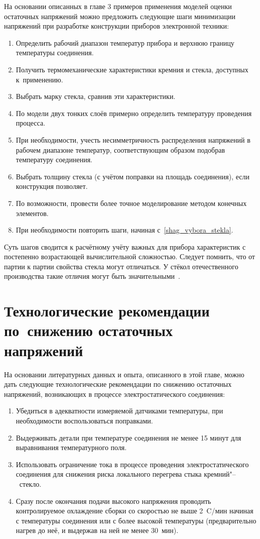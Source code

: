 На основании описанных в главе 3 примеров применения моделей оценки остаточных напряжений можно предложить следующие шаги минимизации напряжений при разработке конструкции приборов электронной техники:
\begin{enumerate}
    \item Определить рабочий диапазон температур прибора и верхнюю границу температуры соединения.
    \item Получить термомеханические характеристики кремния и стекла, доступных к~применению.
    \item\label{shag_vybora_stekla} Выбрать марку стекла, сравнив эти характеристики.
    \item По модели двух тонких слоёв примерно определить температуру проведения процесса.
    \item При необходимости, учесть несимметричность распределения напряжений в рабочем диапазоне температур, соответствующим образом подобрав температуру соединения.
    \item Выбрать толщину стекла
    (с учётом поправки на площадь соединения),
    если конструкция позволяет.
    \item По возможности, провести более точное моделирование методом конечных элементов.
    \item При необходимости повторить шаги, начиная с~\ref{shag_vybora_stekla}.
\end{enumerate}

Суть шагов сводится к расчётному учёту важных для прибора характеристик с постепенно возрастающей вычислительной сложностью. Следует помнить, что от партии к партии свойства стекла могут отличаться. У стёкол отечественного производства такие отличия могут быть значительными~\cite{timoshenkov2009_issled_stekol}.

\section{Технологические рекомендации по~снижению остаточных напряжений}

На основании литературных данных и опыта, описанного в этой главе, можно дать следующие технологические рекомендации по снижению остаточных напряжений, возникающих в процессе электростатического соединения:
\begin{enumerate}
    \item Убедиться в адекватности измеряемой датчиками температуры,
    при необходимости воспользоваться поправками.
    \item Выдерживать детали при температуре соединения не менее 15
    минут для выравнивания температурного поля.
    \item Использовать ограничение тока в процессе проведения
    электростатического соединения для снижения риска локального
    перегрева стыка кремний"--~стекло.
    \item Сразу после окончания подачи высокого напряжения проводить
    контролируемое охлаждение сборки со скоростью не выше
    2~{\textdegree}C/мин начиная с температуры соединения или с более
    высокой температуры (предварительно нагрев до неё, и выдержав на
    ней не менее 30~мин).
\end{enumerate}

